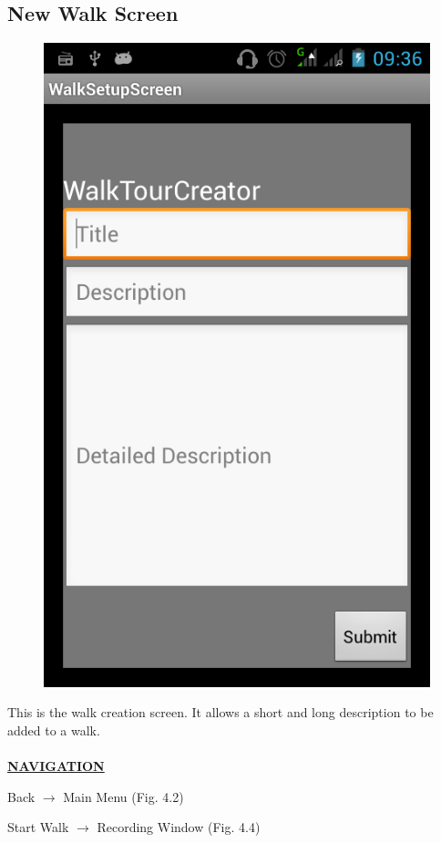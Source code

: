 \documentclass[12pt]{article}
\begin{document}
\subsection{New Walk Screen}
\begin{figure}[htp]
\centering
\includegraphics[scale=0.40]{Project_Plan/android/new_walk.png}
\caption{}
\label{}
\end{figure}
\par{This is the walk creation screen. It allows a short and long description to be added to a walk.  \\ \\}
\textbf{\uline{NAVIGATION}}
\par{Back $\rightarrow$ Main Menu (Fig. 4.2)}
\par{Start Walk $\rightarrow$ Recording Window (Fig. 4.4)}
\clearpage
\end{document}
